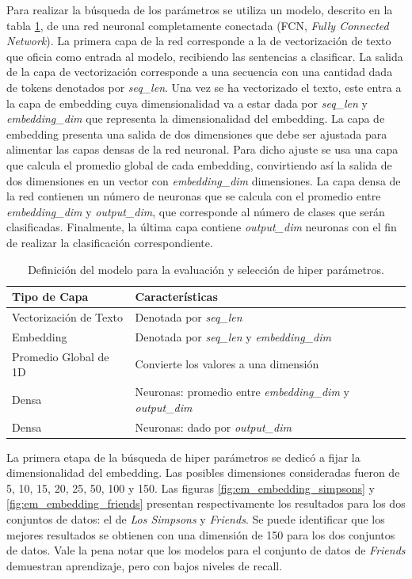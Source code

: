Para realizar la búsqueda de los parámetros se utiliza un modelo, descrito en la tabla \ref{tab:deep_em_hyper_params}, de una red neuronal completamente conectada (FCN, \textit{Fully Connected Network}). La primera capa de la red corresponde a la de vectorización de texto que oficia como entrada al modelo, recibiendo las sentencias a clasificar. La salida de la capa de vectorización corresponde a una secuencia con una cantidad dada de tokens denotados por \textit{seq\_len}. Una vez se ha vectorizado el texto, este entra a la capa de embedding cuya dimensionalidad va a estar dada por \textit{seq\_len} y \textit{embedding\_dim} que representa la dimensionalidad del embedding. La capa de embedding presenta una salida de dos dimensiones que debe ser ajustada para alimentar las capas densas de la red neuronal. Para dicho ajuste se usa una capa que calcula el promedio global de cada embedding, convirtiendo así la salida de dos dimensiones en un vector con \textit{embedding\_dim} dimensiones. La capa densa de la red contienen un número de neuronas que se calcula con el promedio entre \textit{embedding\_dim} y \textit{output\_dim}, que corresponde al número de clases que serán clasificadas. Finalmente, la última capa contiene \textit{output\_dim} neuronas con el fin de realizar la clasificación correspondiente. \\

\begin{table}[H]
    \centering
    \begin{tabular}{|l|l|}
        \hline
        \textbf{Tipo de Capa} & \textbf{Características} \\ \hline
        Vectorización de Texto & Denotada por \textit{seq\_len} \\ \hline
        Embedding & Denotada por \textit{seq\_len} y \textit{embedding\_dim} \\ \hline
        Promedio Global de 1D & Convierte los valores a una dimensión \\ \hline
        Densa & Neuronas: promedio entre \textit{embedding\_dim} y \textit{output\_dim} \\ \hline
        Densa & Neuronas: dado por \textit{output\_dim} \\ \hline
    \end{tabular}
    \caption{Definición del modelo para la evaluación y selección de hiper parámetros.}
    \label{tab:deep_em_hyper_params}
\end{table}

La primera etapa de la búsqueda de hiper parámetros se dedicó a fijar la dimensionalidad del embedding. Las posibles dimensiones consideradas fueron de 5, 10, 15, 20, 25, 50, 100 y 150. Las figuras \ref{fig:em_embedding_simpsons} y \ref{fig:em_embedding_friends} presentan respectivamente los resultados para los dos conjuntos de datos: el de \textit{Los Simpsons} y \textit{Friends}. Se puede identificar que los mejores resultados se obtienen con una dimensión de 150 para los dos conjuntos de datos. Vale la pena notar que los modelos para el conjunto de datos de \textit{Friends} demuestran aprendizaje, pero con bajos niveles de recall.  \\

